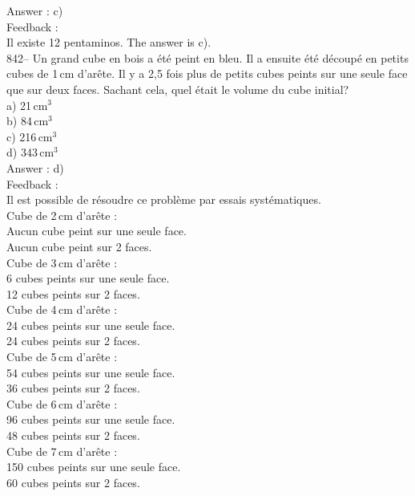 \documentclass[letterpaper, 12pt]{article}
\begin{document}
Answer : c)\\

Feedback : \\
Il existe 12 pentaminos.  The answer is c).\\

842-- Un grand cube en bois a \'et\'e peint en bleu.  Il a ensuite \'et\'e
d\'ecoup\'e en petits cubes de 1\,cm d'ar\^ete.  Il y a 2,5 fois plus de
petits cubes peints sur une seule face que sur deux faces.  Sachant cela,
quel \'etait le volume du cube initial?\\
a) 21\,cm$^{3}$\\
b) 84\,cm$^{3}$\\
c) 216\,cm$^{3}$\\
d) 343\,cm$^{3}$\\

Answer : d)\\

Feedback : \\
Il est possible de r\'esoudre ce probl\`eme par essais syst\'ematiques.  \\
Cube de 2\,cm d'ar\^ete :\\
Aucun cube peint sur une seule face.\\
Aucun cube peint sur 2 faces.\\

Cube de 3\,cm d'ar\^ete :\\
6 cubes peints sur une seule face.\\
12 cubes peints sur 2 faces.\\

Cube de 4\,cm d'ar\^ete :\\
24 cubes peints sur une seule face.\\
24 cubes peints sur 2 faces.\\

Cube de 5\,cm d'ar\^ete :\\
54 cubes peints sur une seule face.\\
36 cubes peints sur 2 faces.\\

Cube de 6\,cm d'ar\^ete :\\
96 cubes peints sur une seule face.\\
48 cubes peints sur 2 faces.\\

Cube de 7\,cm d'ar\^ete :\\
150 cubes peints sur une seule face.\\
60 cubes peints sur 2 faces.\\
\end{document}
